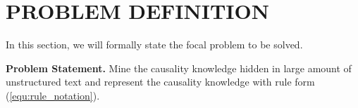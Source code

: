  
\section{PROBLEM DEFINITION}
\label{sec:problem}

In this section, we will formally state the focal problem to be solved.



% 
 \textbf{Problem Statement.} Mine the causality knowledge hidden in large amount of unstructured text and represent the causality knowledge with rule form (\ref{equ:rule_notation}).  
